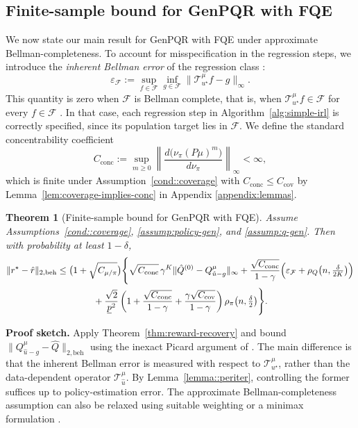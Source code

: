 \documentclass{article}
\newtheorem{theorem}{Theorem}
\newcommand{\1}{\mathbbm{1}}
\begin{document}
\subsection{Finite-sample bound for GenPQR with FQE}
\label{sec:theory3}

We now state our main result for GenPQR with FQE under approximate Bellman-completeness. To account for misspecification in the regression steps, we introduce the
\emph{inherent Bellman error} of the regression class \citep{munos2008finite}:
\[
\varepsilon_{\mathcal F}
:=
\sup_{f \in \mathcal F}\inf_{g \in \mathcal F}
\|\mathcal T_{u^\star}^\mu f-g\|_{\infty}.
\]
This quantity is zero when \(\mathcal F\) is Bellman complete, that is, when
\(\mathcal T_{u^\star}^\mu f \in \mathcal F\) for every \(f \in \mathcal F\)
\citep{chen2019information}. In that case, each regression step in
Algorithm~\ref{alg:simple-irl} is correctly specified, since its population
target lies in \(\mathcal F\). We define the standard concentrability coefficient
\[
C_{\mathrm{conc}}
:=
\sup_{m\ge 0}
\left\|
\frac{d\bigl(\nu_\pi (P\mu)^m\bigr)}{d\nu_\pi}
\right\|_\infty < \infty,
\]
which is finite under  Assumption~\ref{cond::coverage} with $C_{\mathrm{conc}}
\le C_{\mathrm{cov}}$ by Lemma~\ref{lem:coverage-implies-conc} in Appendix \ref{appendix:lemmas}. 
 

\begin{theorem}[Finite-sample bound for GenPQR with FQE]
\label{thm:pqr-fqe}
Assume Assumptions~\ref{cond::coverage}, \ref{assump:policy-gen}, and
\ref{assump:q-gen}.
Then with probability at least \(1-\delta\),
\begin{align*}
\|r^\star-\hat r\|_{2,\mathrm{beh}}
&\le
\bigl(1+\sqrt{C_{\mu/\pi}}\bigr)
\Bigg\{
\sqrt{C_{\mathrm{conc}}}\,
\gamma^K \|\hat Q^{(0)}-Q^\mu_{\hat u-g}\|_{\infty}
+
\frac{\sqrt{C_{\mathrm{conc}}}}{1-\gamma}
\Bigl(
\varepsilon_{\mathcal F}
+\rho_Q\bigl(n,\tfrac{\delta}{2K}\bigr)
\Bigr)
\\
&\qquad\qquad+
\frac{\sqrt{2}}{\underline p^{2}}\left(
1
+\frac{\sqrt{C_{\mathrm{conc}}}}{1-\gamma}
+\frac{\gamma\sqrt{C_{\mathrm{cov}}}}{1-\gamma}
\right)
\rho_\pi\bigl(n,\tfrac{\delta}{2}\bigr)
\Bigg\}.
\end{align*}
\end{theorem}
\textbf{Proof sketch.}
Apply Theorem~\ref{thm:reward-recovery} and bound
\(\|Q^\mu_{\hat u-g}-\hat Q\|_{2,\mathrm{beh}}\) using the inexact Picard
argument of \citet{munos2008finite}. The main difference is that the inherent
Bellman error is measured with respect to \(\mathcal T^\mu_{u^\star}\), rather
than the data-dependent operator \(\mathcal T^\mu_{\hat u}\). By
Lemma~\ref{lemma::periter}, controlling the former suffices up to
policy-estimation error. The approximate Bellman-completeness assumption can
also be relaxed using suitable weighting \citep{van2025fitted} or a minimax
formulation \citep{uehara2023offline}.
\end{document}
